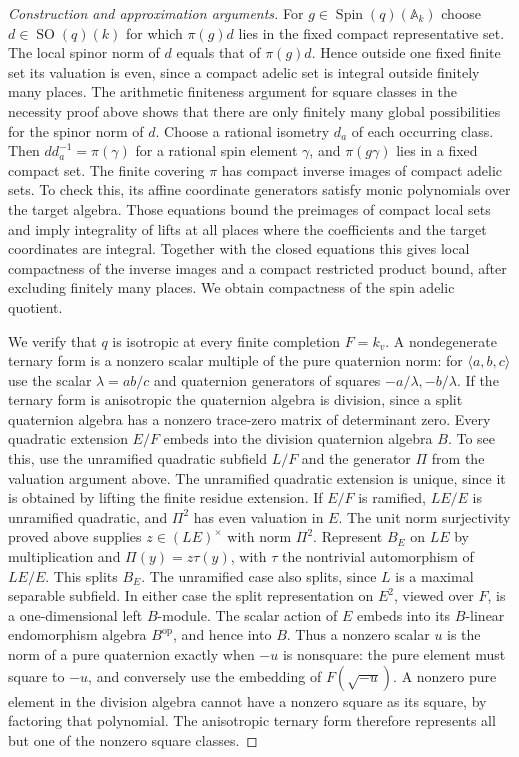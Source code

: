 \documentclass[11pt,a4paper,openany,oneside]{book}
\theoremstyle{resultstyle}
\theoremstyle{definition}
\numberwithin{equation}{chapter}
\begin{document}
\begin{proof}[Construction and approximation arguments]
For \(g\in\operatorname{Spin}(q)(\mathbb A_k)\) choose
\(d\in\operatorname{SO}(q)(k)\) for which \(\pi(g)d\) lies in
the fixed compact representative set. The local spinor
norm of \(d\) equals that of \(\pi(g)d\). Hence outside
one fixed finite set its valuation is even, since a
compact adelic set is integral outside finitely many places.
The arithmetic finiteness argument for square classes in
the necessity proof above shows that there are only finitely
many global possibilities for the spinor norm of \(d\).
Choose a rational isometry \(d_a\) of each occurring class.
Then \(dd_a^{-1}=\pi(\gamma)\) for a rational spin element
\(\gamma\), and \(\pi(g\gamma)\) lies in a fixed compact set.
The finite covering \(\pi\) has compact inverse images of
compact adelic sets. To check this, its affine coordinate
generators satisfy monic polynomials over the target algebra.
Those equations bound the preimages of compact local sets
and imply integrality of lifts at all places where the
coefficients and the target coordinates are integral.
Together with the closed equations this gives local
compactness of the inverse images and a compact restricted
product bound, after excluding finitely many places.
We obtain compactness of the spin adelic quotient.

We verify that \(q\) is isotropic at every finite completion
\(F=k_v\). A nondegenerate ternary form is a nonzero scalar
multiple of the pure quaternion norm: for
\(\langle a,b,c\rangle\) use the scalar \(\lambda=ab/c\)
and quaternion generators of squares \(-a/\lambda,-b/\lambda\).
If the ternary form is anisotropic the quaternion algebra is
division, since a split quaternion algebra has a nonzero
trace-zero matrix of determinant zero. Every quadratic
extension \(E/F\) embeds into the division quaternion
algebra \(B\). To see this, use the unramified quadratic
subfield \(L/F\) and the generator \(\Pi\) from the valuation
argument above. The unramified quadratic extension is unique,
since it is obtained by lifting the finite residue extension.
If \(E/F\) is ramified, \(LE/E\) is unramified quadratic,
and \(\Pi^2\) has even valuation in \(E\). The unit norm
surjectivity proved above supplies \(z\in(LE)^\times\) with
norm \(\Pi^2\). Represent \(B_E\) on \(LE\) by multiplication
and \(\Pi(y)=z\tau(y)\), with \(\tau\) the nontrivial
automorphism of \(LE/E\). This splits \(B_E\). The unramified
case also splits, since \(L\) is a maximal separable subfield.
In either case the split representation on \(E^2\), viewed
over \(F\), is a one-dimensional left \(B\)-module.
The scalar action of \(E\) embeds into its \(B\)-linear
endomorphism algebra \(B^{\mathrm{op}}\), and hence into \(B\).
Thus a nonzero scalar \(u\) is the norm of a pure quaternion
exactly when \(-u\) is nonsquare: the pure element must square
to \(-u\), and conversely use the embedding of
\(F(\sqrt{-u})\). A nonzero pure element in the division
algebra cannot have a nonzero square as its square, by
factoring that polynomial. The anisotropic ternary form
therefore represents all but one of the nonzero square classes.


\end{proof}
\end{document}

